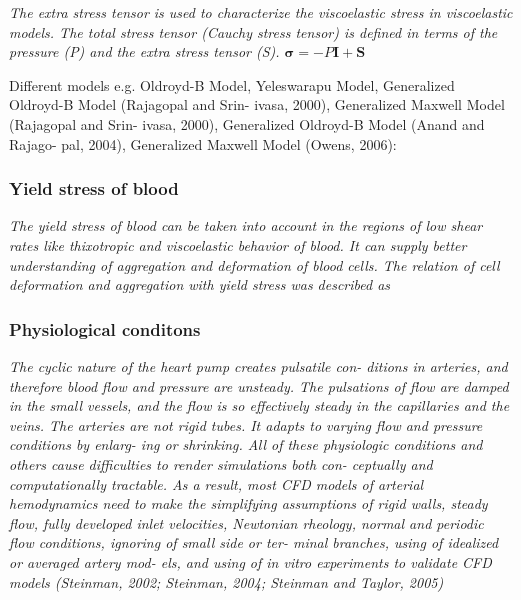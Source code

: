 \documentclass[11pt,letterpaper]{article}
\begin{document}
 \textit{The extra stress tensor is used to characterize the viscoelastic stress in viscoelastic models. The total stress tensor (Cauchy stress tensor) is defined in terms of the pressure (P) and the  extra stress tensor (S). $\bm{\sigma}= -P\bm{I+ \bm{S}}$}

Different models e.g. Oldroyd-B Model, Yeleswarapu Model, Generalized Oldroyd-B Model (Rajagopal and Srin- ivasa, 2000), Generalized Maxwell Model (Rajagopal and Srin- ivasa, 2000), Generalized Oldroyd-B Model (Anand and Rajago- pal, 2004), Generalized Maxwell Model (Owens,  2006):


\subsubsection*{Yield stress of blood}
\textit{The yield  stress of blood can  be taken  into  account in  the
regions of low shear rates like thixotropic and viscoelastic behavior of blood.  It can supply better  understanding  of aggregation  and  deformation of blood cells. The  relation of cell deformation and aggregation with yield stress was described as}

\subsubsection*{Physiological conditons}
\textit{The cyclic nature  of the  heart  pump creates  pulsatile con-
ditions in arteries, and therefore blood flow and  pressure are unsteady. The pulsations of  flow  are damped in the small vessels, and the  flow is so effectively  steady in  the capillaries and the veins.  The arteries are not rigid tubes. It adapts to varying flow and pressure  conditions  by  enlarg- ing or shrinking. All of these  physiologic conditions and others cause difficulties to  render simulations  both con- ceptually and computationally tractable. As a result, most CFD  models of arterial  hemodynamics need  to make  the simplifying assumptions of  rigid walls, steady flow, fully developed  inlet velocities, Newtonian rheology,  normal and  periodic flow conditions, ignoring of small side or ter- minal  branches, using  of  idealized or averaged artery  mod- els, and using of in vitro  experiments to validate CFD models (Steinman, 2002; Steinman,  2004; Steinman and Taylor, 2005)}
\end{document}
